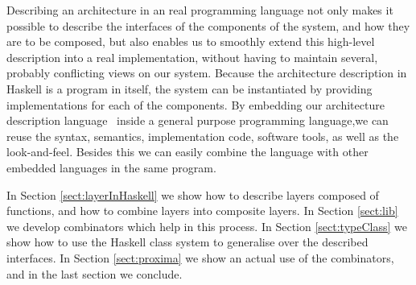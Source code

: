 \documentclass{llncs}
\newcommand{\sds}[1]{{\textcolor{blue}\small\marginpar{}}}
\begin{document}
Describing an architecture in an real programming language not only makes it possible to describe the interfaces of the components of the system, and how they are to be composed, but also enables us to smoothly extend this high-level description into a real implementation, without having to maintain several, probably conflicting views on our system. Because the architecture description in Haskell is a program in itself, the system can be instantiated by providing implementations for each of the components. By embedding our architecture description language~\cite{hudak98DSLs} inside a general purpose programming language,we can reuse the syntax, semantics, implementation code, software tools, as well as the look-and-feel. Besides this we can easily combine the language with other embedded languages in the same program.

In Section \ref{sect:layerInHaskell} we show how to describe layers composed of functions, and how to combine layers into composite layers. In Section \ref{sect:lib} we develop combinators which help in this process. In Section \ref{sect:typeClass} we show how to use the Haskell class system to generalise over the described interfaces. In Section \ref{sect:proxima} we show an actual use of the combinators, and in the last section we conclude.
\sds{add summary}
			
\end{document}
